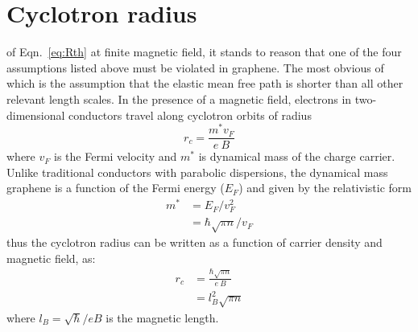 \section{Cyclotron radius}
 of Eqn.~\ref{eq:Rth} at finite magnetic field, it stands to reason that one of the four assumptions listed above must be violated in graphene. The most obvious of which is the assumption that the elastic mean free path is shorter than all other relevant length scales. In the presence of a magnetic field, electrons in two-dimensional conductors travel along cyclotron orbits of radius 
\begin{equation}
r_c=\frac{m^*v_F}{e~B}
\end{equation}
where $v_F$ is the Fermi velocity and $m^*$ is dynamical mass of the charge carrier. Unlike traditional conductors with parabolic dispersions, the dynamical mass graphene is a function of the Fermi energy ($E_F$) and given by the relativistic form 
\begin{align}
m^* &= E_F/v_F^2 \\
 &= \hbar\sqrt{\pi n}/v_F
\end{align}
thus the cyclotron radius can be written as a function of carrier density and magnetic field, as:
\begin{align}
r_c &= \frac{\hbar\sqrt{\pi n}}{e~B} \\
 &= l_B^2\sqrt{\pi n}
\end{align}
where $l_B = \sqrt\hbar/eB$ is the magnetic length. 

